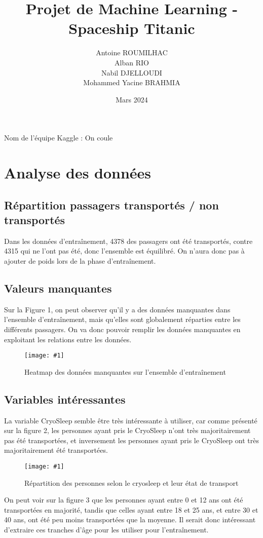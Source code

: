 \documentclass[a4paper]{article}
\title{Projet de Machine Learning - Spaceship Titanic}
\author{Antoine ROUMILHAC \\ Alban RIO \\ Nabil DJELLOUDI \\ Mohammed Yacine BRAHMIA}
\date{Mars 2024}
\newcommand{\illustration}[3]{
    \begin{figure}[h!]
        \centering
        \texttt{[image: \#1]}
        \caption{#2}
    \end{figure}
}
\begin{document}
    \maketitle

    Nom de l'équipe Kaggle : On coule

    \section{Analyse des données}

    \subsection{Répartition passagers transportés / non transportés}

    Dans les données d'entraînement, 4378 des passagers ont été transportés, contre 4315 qui ne l'ont pas été, donc l'ensemble est équilibré. On n'aura donc pas à ajouter de poids lors de la phase d'entraînement.

    \subsection{Valeurs manquantes}

    
    Sur la Figure 1, on peut observer qu'il y a des données manquantes dans l'ensemble d'entraînement, mais qu'elles sont globalement réparties entre les différents passagers.
    On va donc pouvoir remplir les données manquantes en exploitant les relations entre les données.
    
    \illustration{images/Figure 1.png}{Heatmap des données manquantes sur l'ensemble d'entraînement}{8cm}
    \subsection{Variables intéressantes}

    La variable CryoSleep semble être très intéressante à utiliser, car comme présenté sur la figure 2, les personnes ayant pris le CryoSleep n'ont très majoritairement pas été transportées,
    et inversement les personnes ayant pris le CryoSleep ont très majoritairement été transportées.
    
    \illustration{images/Figure 2.png}{Répartition des personnes selon le cryosleep et leur état de transport}{8cm}
    
    On peut voir sur la figure 3 que les personnes ayant entre 0 et 12 ans ont été transportées en majorité, 
    tandis que celles ayant entre 18 et 25 ans, et entre 30 et 40 ans, ont été peu moins transportées que la moyenne.
    Il serait donc intéressant d'extraire ces tranches d'âge pour les utiliser pour l'entraînement.
\end{document}
